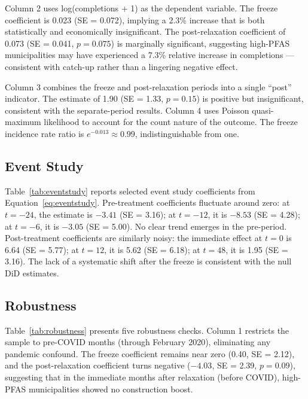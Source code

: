 \documentclass[12pt]{article}
\begin{document}
Column 2 uses log(completions + 1) as the dependent variable. The freeze coefficient is 0.023 (SE = 0.072), implying a 2.3\% increase that is both statistically and economically insignificant. The post-relaxation coefficient of 0.073 (SE = 0.041, $p = 0.075$) is marginally significant, suggesting high-PFAS municipalities may have experienced a 7.3\% relative increase in completions --- consistent with catch-up rather than a lingering negative effect.

Column 3 combines the freeze and post-relaxation periods into a single ``post'' indicator. The estimate of 1.90 (SE = 1.33, $p = 0.15$) is positive but insignificant, consistent with the separate-period results. Column 4 uses Poisson quasi-maximum likelihood to account for the count nature of the outcome. The freeze incidence rate ratio is $e^{-0.013} \approx 0.99$, indistinguishable from one.



\subsection{Event Study}

Table~\ref{tab:eventstudy} reports selected event study coefficients from Equation~\ref{eq:eventstudy}. Pre-treatment coefficients fluctuate around zero: at $t = -24$, the estimate is $-3.41$ (SE = 3.16); at $t = -12$, it is $-8.53$ (SE = 4.28); at $t = -6$, it is $-3.05$ (SE = 5.00). No clear trend emerges in the pre-period. Post-treatment coefficients are similarly noisy: the immediate effect at $t = 0$ is 6.64 (SE = 5.77); at $t = 12$, it is 5.62 (SE = 6.18); at $t = 48$, it is 1.95 (SE = 3.16). The lack of a systematic shift after the freeze is consistent with the null DiD estimates.



\subsection{Robustness}

Table~\ref{tab:robustness} presents five robustness checks. Column 1 restricts the sample to pre-COVID months (through February 2020), eliminating any pandemic confound. The freeze coefficient remains near zero (0.40, SE = 2.12), and the post-relaxation coefficient turns negative ($-4.03$, SE = 2.39, $p = 0.09$), suggesting that in the immediate months after relaxation (before COVID), high-PFAS municipalities showed no construction boost.
\end{document}
